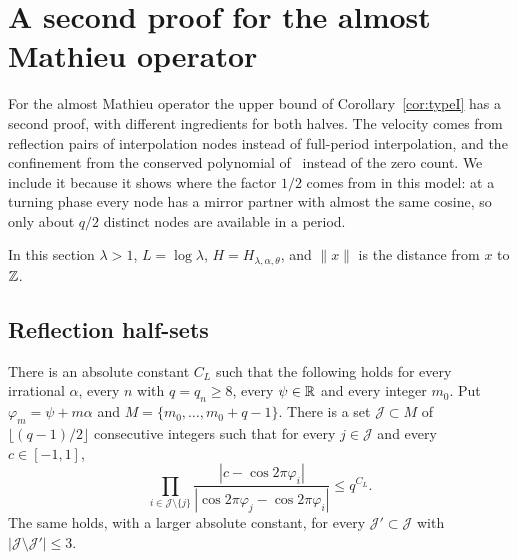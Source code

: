 \section{A second proof for the almost Mathieu operator}\label{sec:amoproof}

For the almost Mathieu operator the upper bound of Corollary~\ref{cor:typeI} has a second proof, with different ingredients for both halves. The velocity comes from reflection pairs of interpolation nodes instead of full-period interpolation, and the confinement from the conserved polynomial of~\cite{DMamo} instead of the zero count. We include it because it shows where the factor $1/2$ comes from in this model: at a turning phase every node has a mirror partner with almost the same cosine, so only about $q/2$ distinct nodes are available in a period.

In this section $\lambda>1$, $L=\log\lambda$, $H=H_{\lambda,\alpha,\theta}$, and $\|x\|$ is the distance from $x$ to $\mathbb Z$.

\subsection{Reflection half-sets}

\begin{lemma}\label{lem:L}
There is an absolute constant $C_L$ such that the following holds for every irrational $\alpha$, every $n$ with $q=q_n\ge8$, every $\psi\in\mathbb R$ and every integer $m_0$. Put $\varphi_m=\psi+m\alpha$ and $M=\{m_0,\dots,m_0+q-1\}$. There is a set $\mathcal J\subset M$ of $\lfloor(q-1)/2\rfloor$ consecutive integers such that for every $j\in\mathcal J$ and every $c\in[-1,1]$,
\[
\prod_{i\in\mathcal J\setminus\{j\}}\frac{|c-\cos2\pi\varphi_i|}{|\cos2\pi\varphi_j-\cos2\pi\varphi_i|}\le q^{C_L}.
\]
The same holds, with a larger absolute constant, for every $\mathcal J'\subset\mathcal J$ with $|\mathcal J\setminus\mathcal J'|\le3$.
\end{lemma}

